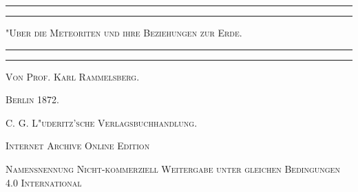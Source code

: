 \documentclass[a4paper, 11pt, oneside, german]{article}
\begin{document}
\begin{titlepage} %
	\centering %

	
	\rule{\textwidth}{1.6pt}\vspace*{-\baselineskip}\vspace*{2pt} %
	\rule{\textwidth}{0.4pt} %
	
	\vspace{1\baselineskip} %
	
	{\scshape\Huge "Uber die Meteoriten und ihre Beziehungen zur Erde.\\[1.25pt]}
	
	\vspace{1\baselineskip} %

	\rule{\textwidth}{0.4pt}\vspace*{-\baselineskip}\vspace{3.2pt} %
	\rule{\textwidth}{1.6pt} %
	
	\vspace{1\baselineskip} %
	
	
		
    {\scshape\large Von Prof. Karl Rammelsberg.} %
    
    \vspace*{\fill}

	\vspace{1\baselineskip}

	{\small\scshape Berlin 1872.}
	
	{\small\scshape{C. G. L"uderitz'sche Verlagsbuchhandlung.}}
	
	\vspace{0.5\baselineskip} %

    \scshape Internet Archive Online Edition  %
	
	{\scshape\small Namensnennung Nicht-kommerziell Weitergabe unter gleichen Bedingungen 4.0 International} %
\end{titlepage}
\setlength{\parskip}{1mm plus1mm minus1mm}
\clearpage
\pagestyle{fancy}
\fancyhf{}
\cfoot{\swabfamily{\thepage}}
\Large
\end{document}
